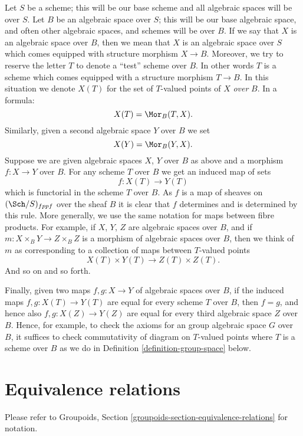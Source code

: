\noindent
Let $S$ be a scheme; this will be our base scheme and all algebraic spaces
will be over $S$. Let $B$ be an algebraic space over $S$; this will be our
base algebraic space, and often other algebraic spaces, and schemes will
be over $B$. If we say that $X$ is an algebraic space over $B$, then we
mean that $X$ is an algebraic space over $S$ which comes equipped with
structure morphism $X \to B$. Moreover, we try to reserve the letter $T$
to denote a ``test'' scheme over $B$. In other words $T$ is a scheme
which comes equipped with a structure morphism $T \to B$.
In this situation we denote $X(T)$ for the set of $T$-valued points of
$X$ {\it over} $B$. In a formula:
$$
X(T) = \Mor_B(T, X).
$$
Similarly, given a second algebraic space $Y$ over $B$ we set
$$
X(Y) = \Mor_B(Y, X).
$$
Suppose we are given algebraic spaces $X$, $Y$ over $B$ as above and a
morphism $f : X \to Y$ over $B$. For any scheme $T$ over $B$ we get an
induced map of sets
$$
f : X(T) \longrightarrow Y(T)
$$
which is functorial in the scheme $T$ over $B$.
As $f$ is a map of sheaves on $(\Sch/S)_{fppf}$ over the
sheaf $B$ it is clear that $f$ determines and is determined by this rule.
More generally, we use the same notation for maps between fibre
products. For example, if
$X$, $Y$, $Z$ are algebraic spaces over $B$, and if
$m : X \times_B Y \to Z \times_B Z$ is
a morphism of algebraic spaces over $B$, then we think of $m$ as corresponding
to a collection of maps between $T$-valued points
$$
X(T) \times Y(T) \longrightarrow Z(T) \times Z(T).
$$
And so on and so forth.

\medskip\noindent
Finally, given two maps
$f, g : X \to Y$ of algebraic spaces over $B$, if the induced maps
$f, g : X(T) \to Y(T)$ are equal for every scheme $T$ over $B$, then
$f = g$, and hence also $f, g : X(Z) \to Y(Z)$ are equal for
every third algebraic space $Z$ over $B$. Hence, for example,
to check the axioms for an group algebraic space $G$ over $B$, it
suffices to check commutativity of diagram on $T$-valued points
where $T$ is a scheme over $B$ as we do in
Definition \ref{definition-group-space}
below.




\section{Equivalence relations}
\label{section-equivalence-relations}

\noindent
Please refer to
Groupoids, Section \ref{groupoids-section-equivalence-relations}
for notation.


